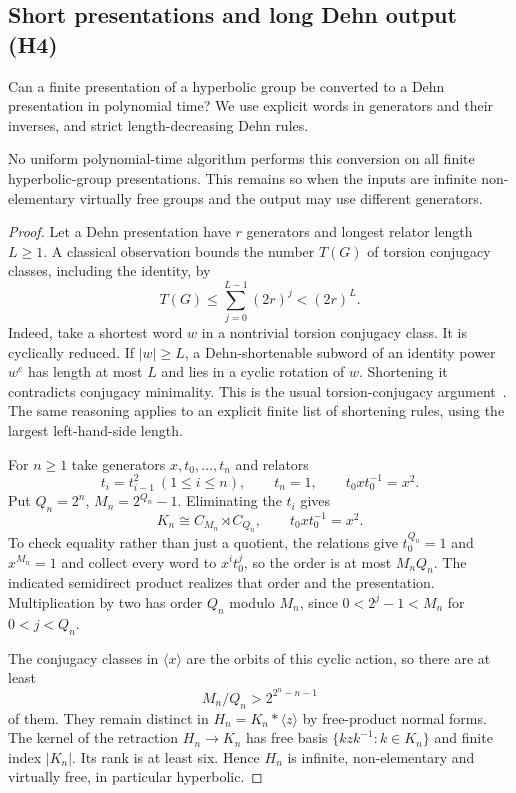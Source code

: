 \subsection{Short presentations and long Dehn output (H4)}\label{sec:h4}
Can a finite presentation of a hyperbolic group be converted to a Dehn
presentation in polynomial time? We use explicit words in generators
and their inverses, and strict length-decreasing Dehn rules.

\begin{theorem}\label{prop:h4}
No uniform polynomial-time algorithm performs this conversion on all
finite hyperbolic-group presentations. This remains so when the inputs
are infinite non-elementary virtually free groups and the output may
use different generators.
\end{theorem}
\begin{proof}
Let a Dehn presentation have $r$ generators and longest relator length
$L\ge1$. A classical observation bounds the number $T(G)$ of torsion
conjugacy classes, including the identity, by
\begin{equation}\label{eq:torsion-dehn}
 T(G)\le\sum_{j=0}^{L-1}(2r)^j<(2r)^L.
\end{equation}
Indeed, take a shortest word $w$ in a nontrivial torsion conjugacy class.
It is cyclically reduced. If $|w|\ge L$, a Dehn-shortenable subword
of an identity power $w^e$ has length at most $L$ and lies in a cyclic
rotation of $w$. Shortening it contradicts conjugacy minimality. This
is the usual torsion-conjugacy argument~\cite[Theorem 3.27]{batty-papasoglu}.
The same reasoning applies to an explicit finite list of shortening
rules, using the largest left-hand-side length.

For $n\ge1$ take generators $x,t_0,\ldots,t_n$ and relators
\begin{equation}\label{eq:short-presentation}
 t_i=t_{i-1}^2\ (1\le i\le n),\qquad t_n=1,
 \qquad t_0xt_0^{-1}=x^2.
\end{equation}
Put $Q_n=2^n$, $M_n=2^{Q_n}-1$. Eliminating the $t_i$ gives
\[
 K_n\cong C_{M_n}\rtimes C_{Q_n},\qquad t_0xt_0^{-1}=x^2.
\]
To check equality rather than just a quotient, the relations give
$t_0^{Q_n}=1$ and $x^{M_n}=1$ and collect every word to
$x^it_0^j$, so the order is at most $M_nQ_n$. The indicated
semidirect product realizes that order and the presentation. Multiplication
by two has order $Q_n$ modulo $M_n$, since $0<2^j-1<M_n$ for
$0<j<Q_n$.

The conjugacy classes in $\langle x\rangle$ are the orbits of this
cyclic action, so there are at least
\[
 M_n/Q_n>2^{2^n-n-1}
\]
of them. They remain distinct in $H_n=K_n*\langle z\rangle$ by
free-product normal forms. The kernel of the retraction $H_n\to K_n$
has free basis $\{kzk^{-1}:k\in K_n\}$ and finite index $|K_n|$.
Its rank is at least six. Hence $H_n$ is infinite, non-elementary
and virtually free, in particular hyperbolic.


\end{proof}
